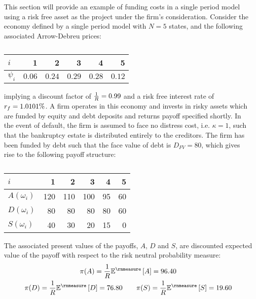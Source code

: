 \documentclass[main.tex]{subfiles}
\begin{document}
    This section will provide an example of funding costs in a single period model
    using a risk free asset as the project under the firm's consideration.
    Consider the economy defined by a single period model with $N=5$ states, 
    and the following associated Arrow-Debreu prices:
        \begin{table}[H]
            \centering
            \begin{tabular}{l|rrrrr}
                $i$ & 1 & 2 & 3 & 4 & 5 \\
                \hline
                $\psi_{i}$ & $0.06$ & $0.24$ & $0.29$ & $0.28$ & $0.12$ \\
            \end{tabular}
            \caption{}
            \label{tbl:example-firm-structure}
        \end{table}
    implying a discount factor of $\frac{1}{R} = 0.99$ and a risk free interest rate of $r_{f} = 1.0101\%$.
    A firm operates in this economy and invests in risky assets 
    which are funded by equity and debt deposits and returns payoff specified shortly.
    In the event of default, the firm is assumed to face no distress cost, i.e. $\kappa = 1$, 
    such that the bankruptcy estate is distributed entirely to the creditors.
    The firm has been funded by debt such that the face value of debt is $D_{FV} = 80$, 
    which gives rise to the following payoff structure:
    \begin{table}[H]
        \centering
        \begin{tabular}{l|rrrrr}
            $i$ & 1 & 2 & 3 & 4 & 5 \\
            \hline
            $A(\omega_{i})$ & 120 & 110 & 100 & 95 & 60 \\
            $D(\omega_{i})$ & 80 & 80 & 80 & 80 & 60 \\
            $S(\omega_{i})$ & 40 & 30 & 20 & 15 & 0
        \end{tabular}
        \caption{}
    \end{table}
    The associated present values of the payoffs, $A$, $D$ and $S$, 
    are discounted expected value of the payoff with respect to the risk neutral probability measure:
        \begin{gather}
            \pi(A) = \discountfactor \mathbb{E}^{\rnmeasure}\left[A\right] = 96.40 \\
            \pi(D) = \discountfactor \mathbb{E}^{\rnmeasure}\left[D\right] = 76.80
            \qquad \pi(S) = \discountfactor \mathbb{E}^{\rnmeasure}\left[S\right] = 19.60
        \end{gather}
\end{document}

